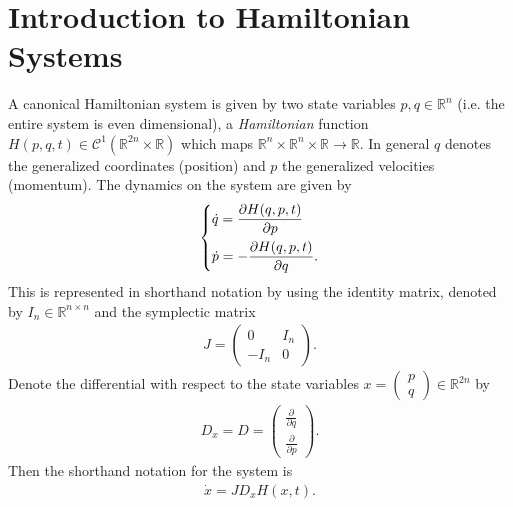 \chapter{Introduction to Hamiltonian Systems}
A canonical Hamiltonian system is given by two state variables $p,q \in \mathbb{R}^{n}$ (i.e. the entire system is even dimensional), a \emph{Hamiltonian} function $H(p,q,t)\in \mathcal{C}^{1}(\mathbb{R}^{2n}\times \mathbb{\mathbb{R}})$ which maps $\mathbb{R}^{n}\times\mathbb{R}^{n}\times\mathbb{R}\to \mathbb{R}$. In general $q$ denotes the generalized coordinates (position) and $p$ the generalized velocities (momentum). The dynamics on the system are given by
\begin{align}
	\begin{dcases}
		\dot{q} = \frac{\partial H(q,p,t)}{\partial p}\\
		\dot{p} = - \frac{\partial H(q,p,t)}{\partial q}.
	\end{dcases}
\end{align}
This is represented in shorthand notation by using the identity matrix, denoted by $I_{n}\in\mathbb{R}^{n\times n}$ and the symplectic matrix
\begin{align}
	J = 
	\begin{pmatrix}
		0 & I_{n}\\
		-I_{n} & 0
	\end{pmatrix}
.	
\end{align}
Denote the differential with respect to the state variables $x =
\begin{pmatrix}
	p \\ q
\end{pmatrix}
\in \mathbb{R}^{2n}$ by
\begin{align}
	D_{x} = D = 
	\begin{pmatrix}
		\frac{\partial}{\partial q} \\
		\frac{\partial}{\partial p}
	\end{pmatrix}
.	
\end{align}
Then the shorthand notation for the system is
\begin{align}
	\boxed{
	\dot{x} = JD_{x}H(x,t).
}
\end{align}


